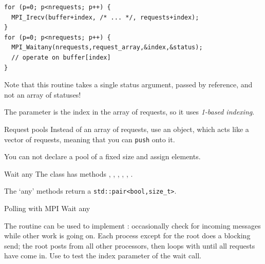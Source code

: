 \begin{lstlisting}
for (p=0; p<nrequests; p++) {
  MPI_Irecv(buffer+index, /* ... */, requests+index);
}
for (p=0; p<nrequests; p++) {
  MPI_Waitany(nrequests,request_array,&index,&status);
  // operate on buffer[index]
}
\end{lstlisting}

Note that this routine takes a single status argument, passed by
reference, and not an array of statuses!

\begin{fortrannote}
  The  parameter is the index in the array of requests,
  so it uses \emph{1-based indexing}.

\end{fortrannote}

\begin{mplnote}{Request pools}
  \label{mpl:req_pool}
  Instead of an array of requests,
  use an  object,
  which acts like a vector of requests,
  meaning that you can \lstinline+push+ onto it.


  You can not declare a pool of a fixed size and assign elements.
\end{mplnote}

\begin{mplnote}{Wait any}
  The  class has methods
  , ,
  , ,
  , .

  The `any' methods return a \lstinline+std::pair<bool,size_t>+.
\end{mplnote}

 {Polling with MPI Wait any}

The  routine can be used to implement
: occasionally check for incoming messages while
other work is going on.
%
%
%
Each process except for the root does a blocking send; the root
posts  from all other processors, then loops
with  until all requests have come in. Use
 to test the index parameter of the wait
call.

